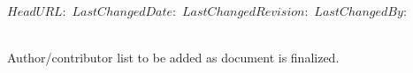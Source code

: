 \svnidlong
{$HeadURL: $}
{$LastChangedDate: $}
{$LastChangedRevision: $}
{$LastChangedBy: $}


\thispagestyle{empty}%
\vspace*{\fill}
\begin{fullwidth}
\sffamily
{
  \Large
  \fontsize{20}{24}\selectfont 
  \smallcaps
  \@title
}\\
\vspace{4\baselineskip}
{\Large 
\noindent
% 
Author/contributor list to be added as document is finalized.
}\\
\vspace{4\baselineskip}
\noindent
\@date\\
\vspace{\baselineskip}
\end{fullwidth}
\vspace*{\fill}
